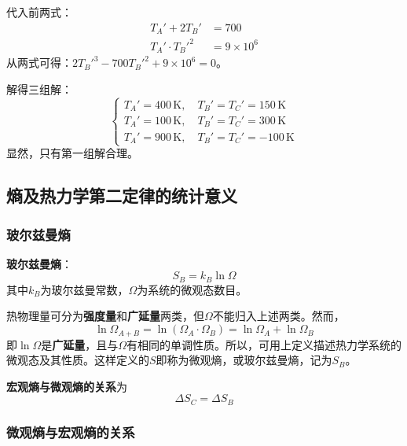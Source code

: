 \documentclass[UTF8]{ctexart}
\theoremstyle{definition}
\begin{document}
代入前两式：
\begin{align}
T_A' + 2T_B' &= 700 \\
T_A'\cdot T_B'^2 &= 9\times10^6
\end{align}
从两式可得：$2T_B'^3 - 700T_B'^2 + 9\times10^6 = 0$。

解得三组解：
\begin{equation*}
\begin{cases}
T_A' = 400\,\mathrm{K},\quad T_B'=T_C'=150\,\mathrm{K} \\[4pt]
T_A' = 100\,\mathrm{K},\quad T_B'=T_C'=300\,\mathrm{K} \\[4pt]
T_A' = 900\,\mathrm{K},\quad T_B'=T_C'=-100\,\mathrm{K}
\end{cases}
\end{equation*}
显然，只有第一组解合理。

\subsection{熵及热力学第二定律的统计意义}

\subsubsection*{玻尔兹曼熵}

\textbf{玻尔兹曼熵}：
\begin{equation}
\boxed{S_B = k_B\ln\Omega}
\end{equation}
其中$k_B$为玻尔兹曼常数，$\Omega$为系统的微观态数目。

热物理量可分为\textbf{强度量}和\textbf{广延量}两类，但$\Omega$不能归入上述两类。然而，
\begin{equation}
\ln\Omega_{A+B} = \ln(\Omega_A\cdot\Omega_B) = \ln\Omega_A + \ln\Omega_B
\end{equation}
即$\ln\Omega$是\textbf{广延量}，且与$\Omega$有相同的单调性质。所以，可用上定义描述热力学系统的微观态及其性质。这样定义的$S$即称为微观熵，或玻尔兹曼熵，记为$S_B$。

\textbf{宏观熵与微观熵的关系}为
\begin{equation}
\boxed{\Delta S_C = \Delta S_B}
\end{equation}

\subsubsection*{微观熵与宏观熵的关系}
\end{document}
